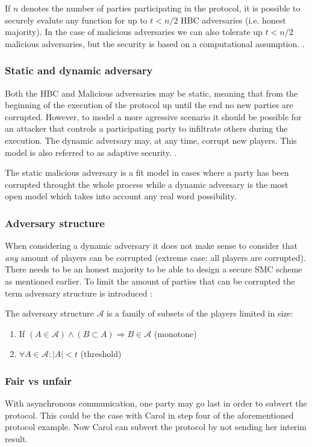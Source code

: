 \documentclass[12pt,a4paper]{scrartcl}				%
\begin{document}
If $n$ denotes the number of parties participating in the protocol, it is possible to securely evalute any function for up to $t<n/2$ HBC adversaries (i.e. honest majority). In the case of malicious adversaries we can also tolerate up $t<n/2$ malicious adversaries, but the security is based on a computational assumption. \cite{smart2003}\cite[p.220]{goldreich1987play}.

\subsubsection{Static and dynamic adversary}
Both the HBC and Malicious adversaries may be static, meaning that from the beginning of the execution of the protocol up until the end no new parties are corrupted. However, to model a more agressive scenario it should be possible for an attacker that controls a participating party to infiltrate others during the execution. The dynamic adversary may, at any time, corrupt new players. This model is also referred to as adaptive security. \cite[p.79]{Cramer}.

The static malicious adversary is a fit model in cases where a party has been corrupted throught the whole process while a dynamic adversary is the most open model which takes into account any real word possibility. \cite{smart2003}

\subsubsection{Adversary structure}
\label{AS}
When considering a dynamic adversary it does not make sense to consider that \textit{any} amount of players can be corrupted (extreme case: all players are corrupted). There needs to be an honest majority to be able to design a secure SMC scheme as mentioned earlier. To limit the amount of parties that can be corrupted the term adversary structure is introduced \cite{cramer2009}: 

The adversary structure $\mathcal{A}$ is a family of subsets of the players limited in size:
\begin{enumerate}
	 \item If $(A\in \mathcal{A}) \wedge  (B\subset A) \Longrightarrow B\in \mathcal{A}$  (monotone)
	 
	 \item $\forall A\in \mathcal{A}: |A|<t$ (threshold)
\end{enumerate}

\subsubsection{Fair vs unfair}
\label{FU}
With asynchronous communication, one party may go last in order to subvert the protocol. This could be the case with Carol in step four of the aforementioned protocol example. Now Carol can subvert the protocol by not sending her interim result.
\end{document}
